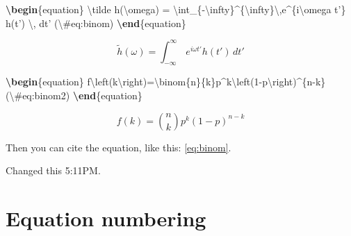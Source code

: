 \documentclass[]{book}
\newenvironment{Shaded}{\begin{snugshade}}{\end{snugshade}}
\newcommand{\ExtensionTok}[1]{#1}
\newcommand{\KeywordTok}[1]{\textcolor[rgb]{0.13,0.29,0.53}{\textbf{#1}}}
\newcommand{\NormalTok}[1]{#1}
\newcommand{\SpecialCharTok}[1]{\textcolor[rgb]{0.00,0.00,0.00}{#1}}
\newcommand{\SpecialStringTok}[1]{\textcolor[rgb]{0.31,0.60,0.02}{#1}}
\begin{document}
\begin{Shaded}
\begin{Highlighting}[]
\KeywordTok{\textbackslash{}begin}\NormalTok{\{}\ExtensionTok{equation}\NormalTok{\}}\SpecialStringTok{ }
\SpecialStringTok{  }\SpecialCharTok{\textbackslash{}tilde}\SpecialStringTok{ h(}\SpecialCharTok{\textbackslash{}omega}\SpecialStringTok{) = }\SpecialCharTok{\textbackslash{}int}\SpecialStringTok{_\{-}\SpecialCharTok{\textbackslash{}infty}\SpecialStringTok{\}^\{}\SpecialCharTok{\textbackslash{}infty}\SpecialStringTok{\}}\SpecialCharTok{\textbackslash{},}\SpecialStringTok{e^\{i}\SpecialCharTok{\textbackslash{}omega}\SpecialStringTok{ t'\} h(t') }\SpecialCharTok{\textbackslash{},}\SpecialStringTok{ dt'}
\SpecialStringTok{  (}\SpecialCharTok{\textbackslash{}#}\SpecialStringTok{eq:binom)}
\KeywordTok{\textbackslash{}end}\NormalTok{\{}\ExtensionTok{equation}\NormalTok{\} }
\end{Highlighting}
\end{Shaded}

\begin{equation}
  \tilde h(\omega) = \int_{-\infty}^{\infty}\,e^{i\omega t'} h(t') \, dt'
  \label{eq:binom}
\end{equation}

\begin{Shaded}
\begin{Highlighting}[]
\KeywordTok{\textbackslash{}begin}\NormalTok{\{}\ExtensionTok{equation}\NormalTok{\}}
\SpecialStringTok{f}\SpecialCharTok{\textbackslash{}left}\SpecialStringTok{(k}\SpecialCharTok{\textbackslash{}right}\SpecialStringTok{)=}\SpecialCharTok{\textbackslash{}binom}\SpecialStringTok{\{n\}\{k\}p^k}\SpecialCharTok{\textbackslash{}left}\SpecialStringTok{(1-p}\SpecialCharTok{\textbackslash{}right}\SpecialStringTok{)^\{n-k\} (}\SpecialCharTok{\textbackslash{}#}\SpecialStringTok{eq:binom2)}
\KeywordTok{\textbackslash{}end}\NormalTok{\{}\ExtensionTok{equation}\NormalTok{\}}
\end{Highlighting}
\end{Shaded}

\begin{equation}
f\left(k\right)=\binom{n}{k}p^k\left(1-p\right)^{n-k} \label{eq:binom2}
\end{equation}

Then you can cite the equation, like this: \eqref{eq:binom}.

Changed this 5:11PM.

\hypertarget{equation-numbering}{%
\section{Equation numbering}\label{equation-numbering}}
\end{document}
